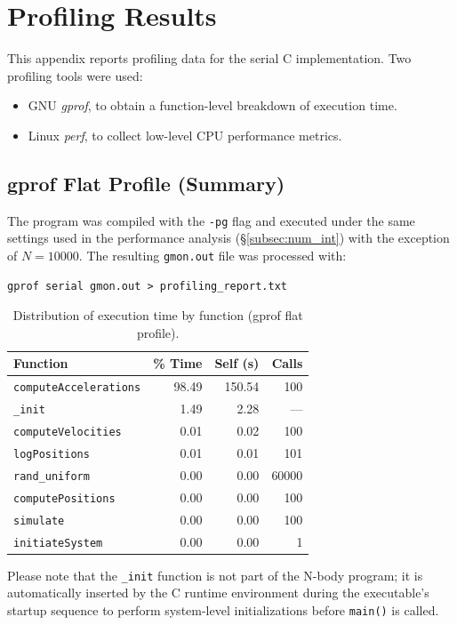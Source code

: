 \documentclass{article}
\begin{document}
\section{Profiling Results}
\label{appendix:profiling_results}
This appendix reports profiling data for the serial C implementation.
Two profiling tools were used:
\begin{itemize}
    \item GNU \emph{gprof}, to obtain a function-level breakdown of execution time.
    \item Linux \emph{perf}, to collect low-level CPU performance metrics.
\end{itemize}

\subsection{gprof Flat Profile (Summary)}
\label{appendix:gprof_results}
The program was compiled with the \texttt{-pg} flag and executed under the same settings used in the performance analysis (\S\ref{subsec:num_int}) with the exception of $N = 10000$. The resulting \texttt{gmon.out} file was processed with:
\begin{verbatim}
gprof serial gmon.out > profiling_report.txt
\end{verbatim}
\begin{table}[H]
\centering
\label{tab:gprof_summary}
\begin{tabular}{lrrr}
\toprule
\textbf{Function} & \textbf{\% Time} & \textbf{Self (s)} & \textbf{Calls}  \\
\midrule
\texttt{computeAccelerations} & 98.49 & 150.54 & 100 \\
\texttt{\_init}               &  1.49 &   2.28 & --- \\
\texttt{computeVelocities}    &  0.01 &   0.02 & 100 \\
\texttt{logPositions}         &  0.01 &   0.01 & 101 \\
\texttt{rand\_uniform}        &  0.00 &   0.00 & 60000 \\
\texttt{computePositions}     &  0.00 &   0.00 & 100 \\
\texttt{simulate}             &  0.00 &   0.00 & 100 \\
\texttt{initiateSystem}       &  0.00 &   0.00 & 1   \\
\bottomrule
\end{tabular}
\caption{Distribution of execution time by function (gprof flat profile).}
\end{table}
Please note that the \texttt{\_init} function is not part of the N-body program; it is automatically inserted by the C runtime environment during the executable’s startup sequence to perform system-level 
initializations before \texttt{main()} is called.
\end{document}
